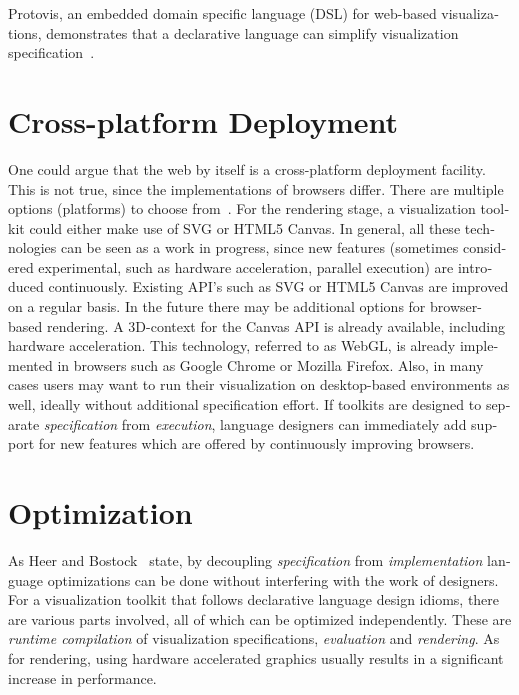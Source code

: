 \begin{english}
Protovis, an embedded domain specific language (DSL) for web-based visualizations, demonstrates that a declarative language can simplify visualization specification~\cite{Protovis09}.


\section{Cross-platform Deployment}

One could argue that the web by itself is a cross-platform deployment facility. This is not true, since the implementations of browsers differ. There are multiple options (platforms) to choose from~\cite{DeclarativeLD10}. For the rendering stage, a visualization toolkit could either make use of SVG or HTML5 Canvas. In general, all these technologies can be seen as a work in progress, since new features (sometimes considered experimental, such as hardware acceleration, parallel execution) are introduced continuously. Existing API's such as SVG or HTML5 Canvas are improved on a regular basis. In the future there may be additional options for browser-based rendering. A 3D-context for the Canvas API  is already available, including hardware acceleration. This technology, referred to as WebGL, is already implemented in browsers such as Google Chrome or Mozilla Firefox. Also, in many cases users may want to run their visualization on desktop-based environments as well, ideally without additional specification effort. If toolkits are designed to separate \emph{specification} from \emph{execution}, language designers can immediately add support for new features which are offered by continuously improving browsers.

\section{Optimization}

As Heer and Bostock~\cite{DeclarativeLD10} state, by decoupling \emph{specification} from \emph{implementation} language optimizations can be done without interfering with the work of designers. For a visualization toolkit that follows declarative language design idioms, there are various parts involved, all of which can be optimized independently. These are \emph{runtime compilation} of visualization specifications, \emph{evaluation} and \emph{rendering}. As for rendering, using hardware accelerated graphics usually results in a significant increase in performance.




\end{english}
